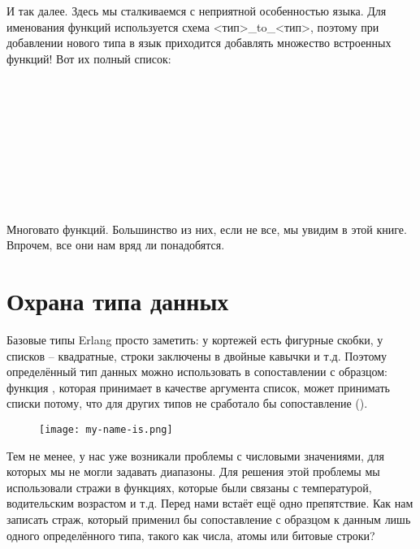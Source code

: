 И так далее.
Здесь мы сталкиваемся с неприятной особенностью языка.
Для именования функций используется схема <тип>\_to\_<тип>, поэтому при добавлении нового типа в язык приходится добавлять множество встроенных функций!
Вот их полный список:\\
\\
\\
\\
\\
\\
\\
\\
\\
\\

Многовато функций.
Большинство из них, если не все, мы увидим в этой книге.
Впрочем, все они нам вряд ли понадобятся.
\section{Охрана типа данных}
\label{to-guard-a-data-type}
Базовые типы Erlang просто заметить: у кортежей есть фигурные скобки, у списков \--- квадратные, строки заключены в двойные кавычки и т.д.
Поэтому определённый тип данных можно использовать в сопоставлении с образцом: функция , которая принимает в качестве аргумента список, может принимать списки потому, что для других типов не сработало бы сопоставление (\ops{[H|\_]}).
\begin{figure}[h!]
    \centering
    \texttt{[image: my-name-is.png]}
\end{figure} 

Тем не менее, у нас уже возникали проблемы с числовыми значениями, для которых мы не могли задавать диапазоны.
Для решения этой проблемы мы использовали стражи в функциях, которые были связаны с температурой, водительским возрастом и т.д.
Перед нами встаёт ещё одно препятствие.
Как нам записать страж, который применил бы сопоставление с образцом к данным лишь одного определённого типа, такого как числа, атомы или битовые строки?

